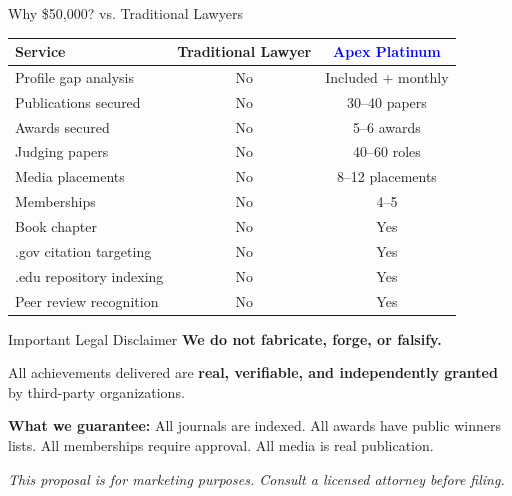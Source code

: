 \documentclass[aspectratio=169, 10pt]{beamer}
\begin{document}
	\begin{frame}{Why \$50,000? vs. Traditional Lawyers}
		\begin{table}
			\centering
			\small
			\begin{tabular}{lcc}
				\toprule
				Service & Traditional Lawyer & \textcolor{blue}{Apex Platinum} \\
				\midrule
				Profile gap analysis & No & Included + monthly \\
				Publications secured & No & 30–40 papers \\
				Awards secured & No & 5–6 awards \\
				Judging papers & No & 40–60 roles \\
				Media placements & No & 8–12 placements \\
				Memberships & No & 4–5 \\
				Book chapter & No & Yes \\
				.gov citation targeting & No & Yes \\
				.edu repository indexing & No & Yes \\
				Peer review recognition & No & Yes \\
				\bottomrule
			\end{tabular}
		\end{table}
		\centering

	\end{frame}
	
	
	\begin{frame}{Important Legal Disclaimer}
		\centering
		\faBalanceScale \hspace{0.2cm} \textbf{We do not fabricate, forge, or falsify.}
		
		\vspace{0.3cm}
		All achievements delivered are \textbf{real, verifiable, and independently granted} by third-party organizations.
		
		\vspace{0.3cm}
		\textbf{What we guarantee:} All journals are indexed. All awards have public winners lists. All memberships require approval. All media is real publication.
		
		\vspace{0.3cm}
		\textit{This proposal is for marketing purposes. Consult a licensed attorney before filing.}
	\end{frame}

	
\end{document}

